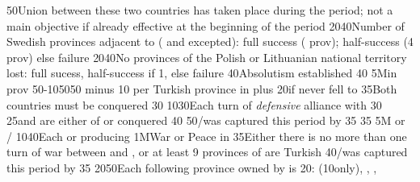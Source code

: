 %
%
{}{50}{Union between these two countries has taken place during the period;
  not a main objective if already effective at the beginning of the period}%
%
%
%
{20}{40}{Number of Swedish provinces adjacent to \regionBaltique (\regionSuede
  and \regionFinlande excepted): full success ( prov);
  half-success (4 prov) else failure}%
%
%
{20}{40}{No provinces of the Polish or Lithuanian national territory lost:
  full sucess, half-success if 1, else failure}%
%
%
{}{40}{Absolutism established}%
%
%
{}{40}{}%
%
\EUobjective5M{\TUR in \payshongrie}{prov}%
{50-10}{50}{50 \VPs minus 10 \VPs per Turkish province in \payshongrie plus
  20\VPs if \villeVienne never fell to \TUR}%
%
 
%
%
{}{35}{Both countries must be conquered}%
%
%
{}{30}{}%
%
%
{10}{30}{Each turn of \emph{defensive} alliance with \paysmajeurFrance}%
%
%
{}{30}{}%
%
%
{}{25}{\paysvalachie and \paysmoldavie are either \VASSAL of \TUR or
  conquered}%
%
%
%
{}{40}{}%
%
%
{}{50}{\provinceOsterreich/\villeVienne was captured this period by \TUR}%
%
%
{}{35}{}%
%
%
{}{35}{}%
%
\EUobjective5M{ or }{\COL/\TP}%
{10}{40}{Each \COL or \TP producing \POSPICE}%
%
%
\EUobjective1M{War or Peace in \payshongrie}{}%
{}{35}{Either there is no more than one turn of war between \AUSaus and \TUR,
  or at least 9 provinces of \payshongrie are Turkish}%
%
%
{}{40}{\provinceOsterreich/\villeVienne was captured this period by \TUR}%
%
%
{}{35}{}%
%
%
{20}{50}{Each following province owned by \TUR is 20\VPs: \provinceCyclades
  (10\VPs only), \provinceKreta, \provinceMalta, \provinceChypre}%
